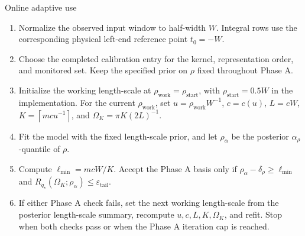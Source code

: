 \documentclass[11pt,a4paper]{article}
\theoremstyle{definition}
\theoremstyle{remark}
\begin{document}
\begin{tartarebox}{Online adaptive use}
\small
\begin{enumerate}[label=\textbf{A\arabic*.},leftmargin=1.8em,itemsep=4pt,topsep=2pt]
\item Normalize the observed input window to half-width \(W\). Integral rows use the corresponding physical left-end reference point \(t_0=-W\).
\item Choose the completed calibration entry for the kernel, representation order, and monitored set. Keep the specified prior on \(\rho\) fixed throughout Phase A.
\item Initialize the working length-scale at \(\rho_{\mathrm{work}}=\rho_{\mathrm{start}}\), with \(\rho_{\mathrm{start}}=0.5W\) in the implementation. For the current \(\rho_{\mathrm{work}}\), set \(u=\rho_{\mathrm{work}}W^{-1}\), \(c=c(u)\), \(L=cW\), \(K=\left\lceil mcu^{-1}\right\rceil\), and \(\Omega_K=\pi K(2L)^{-1}\).
\item Fit the model with the fixed length-scale prior, and let \(\rho_\alpha\) be the posterior \(\alpha_\rho\)-quantile of \(\rho\).
\item Compute \(\ell_{\min}=mcW/K\). Accept the Phase A basis only if \(\rho_\alpha-\delta_\rho\geq \ell_{\min}\) and \(R_{q_\star}(\Omega_K;\rho_\alpha)\leq\varepsilon_{\mathrm{tail}}\).
\item If either Phase A check fails, set the next working length-scale from the posterior length-scale summary, recompute \(u,c,L,K,\Omega_K\), and refit. Stop when both checks pass or when the Phase A iteration cap is reached.
\end{enumerate}


\end{tartarebox}
\end{document}
